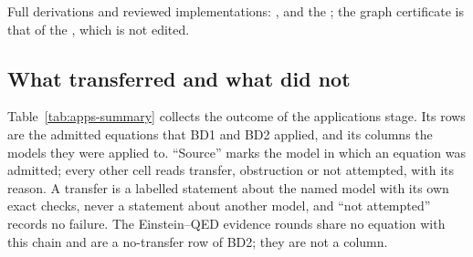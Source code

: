 Full derivations and reviewed implementations:
,
 and the
; the graph
certificate is that of the , which is not edited.

\subsection*{What transferred and what did not}
\label{sec:apps-summary}
Table~\ref{tab:apps-summary} collects the outcome of the applications stage.
Its rows are the admitted equations that BD1 and BD2 applied, and its columns
the models they were applied to. ``Source'' marks the model in which an
equation was admitted; every other cell reads transfer, obstruction or not
attempted, with its reason. A transfer is a labelled statement about the
named model with its own exact checks, never a statement about another model,
and ``not attempted'' records no failure. The Einstein--QED evidence rounds
share no equation with this chain and are a no-transfer row of BD2; they are
not a column.

